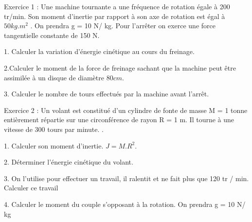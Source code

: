\documentclass[12pt, french]{article}
\begin{document}
\begin{center}
\end{center}


   \begin{Box2}{Exercice 1 : }
Une machine tournante a une fréquence de rotation égale à 200 tr/min. Son moment d'inertie par rapport à son axe de rotation est égal à $50 kg. m^2$ . On prendra g = 10 N/ kg.
Pour l'arrêter on exerce une force tangentielle constante de 150 N.

1. Calculer la variation d'énergie cinétique au cours du freinage.

2.Calculer le moment de la force de freinage sachant que la machine peut être assimilée à un disque de diamètre $80 cm$.

3. Calculer le nombre de tours effectués par la machine avant l'arrêt.
   \end{Box2}


\begin{Box2}{Exercice 2 : }
Un volant est constitué d'un cylindre de fonte de masse M = 1 tonne entièrement répartie sur une circonférence de rayon R = 1 m. Il tourne à une vitesse de 300 tours par minute. .

1. Calculer son moment d’inertie. $J = M.R^2$.

2. Déterminer l'énergie cinétique du volant.

3. On l'utilise pour effectuer un travail, il ralentit et ne fait plus que 120 tr / min. Calculer ce travail

4. Calculer le moment du couple s'opposant à la rotation. On prendra g = 10 N/ kg

\end{Box2}
\end{document}
